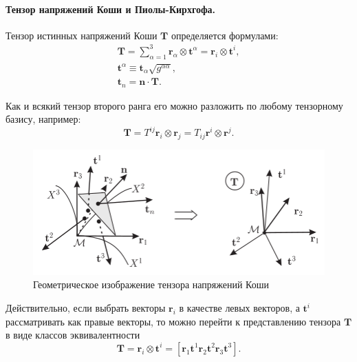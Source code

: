 
\paragraph{Тензор напряжений Коши и Пиолы-Кирхгофа.}

Тензор истинных напряжений Коши $\mathbf{T}$ определяется формулами:
\begin{gather*}
	\mathbf{T} = \sum\limits_{\alpha = 1}^{3} \mathbf{r}_{\alpha} \otimes \mathbf{t}^{\alpha} = \mathbf{r}_{i} \otimes \mathbf{t}^i, \\
	\mathbf{t}^{\alpha} \equiv \mathbf{t}_{\alpha} \sqrt{g^{\alpha\alpha}}, \\
	\mathbf{t}_{n} = \mathbf{n} \cdot \mathbf{T}.
\end{gather*}

Как и всякий тензор второго ранга его можно разложить по любому тензорному базису, например:
\begin{equation*}
	\mathbf{T} = T^{ij} \mathbf{r}_i \otimes \mathbf{r}_j = T_{ij} \mathbf{r}^{i} \otimes \mathbf{r}^{j}.
\end{equation*}

\begin{figure}[H]
	\centering
	\includegraphics[width=0.6\linewidth]{img/que18}
	\caption{Геометрическое изображение тензора напряжений Коши}
	\label{fig:que18}
\end{figure}

Действительно, если выбрать векторы $\mathbf{r}_i$ в качестве левых векторов, а $\mathbf{t}^i$ рассматривать как правые векторы, то можно перейти к представлению тензора $\mathbf{T}$ в виде классов эквивалентности 
\begin{equation*}
	\mathbf{T} = \mathbf{r}_i \otimes \mathbf{t}^i = \left[\mathbf{r}_1 \mathbf{t}^1 \mathbf{r}_2 \mathbf{t}^2 \mathbf{r}_3 \mathbf{t}^3\right].
\end{equation*}

